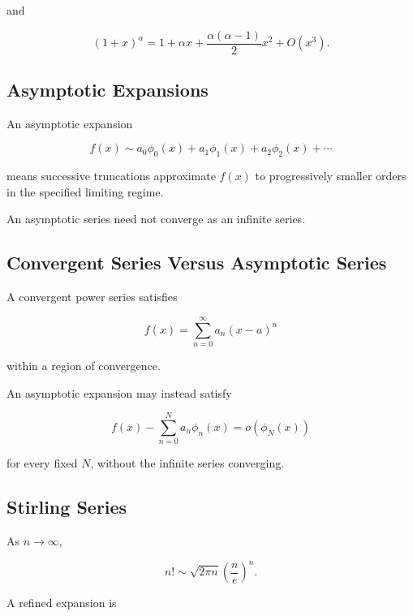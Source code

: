 and

\[
\boxed{
(1+x)^\alpha
=
1+\alpha x
+
\frac{\alpha(\alpha-1)}{2}x^2
+
O(x^3).
}
\]

\subsection{Asymptotic Expansions}
\label{subsec:asymptotic-expansions-reference}

An asymptotic expansion

\[
\boxed{
f(x)
\sim
a_0\phi_0(x)
+
a_1\phi_1(x)
+
a_2\phi_2(x)
+\cdots
}
\]

means successive truncations approximate \(f(x)\) to progressively smaller
orders in the specified limiting regime.

An asymptotic series need not converge as an infinite series.

\subsection{Convergent Series Versus Asymptotic Series}
\label{subsec:convergent-vs-asymptotic-series}

A convergent power series satisfies

\[
\boxed{
f(x)
=
\sum_{n=0}^{\infty}a_n(x-a)^n
}
\]

within a region of convergence.

An asymptotic expansion may instead satisfy

\[
\boxed{
f(x)
-
\sum_{n=0}^{N}
a_n\phi_n(x)
=
o(\phi_N(x))
}
\]

for every fixed \(N\), without the infinite series converging.

\subsection{Stirling Series}
\label{subsec:stirling-series-reference}

As \(n\to\infty\),

\[
\boxed{
n!
\sim
\sqrt{2\pi n}
\left(
\frac{n}{e}
\right)^n.
}
\]

A refined expansion is

